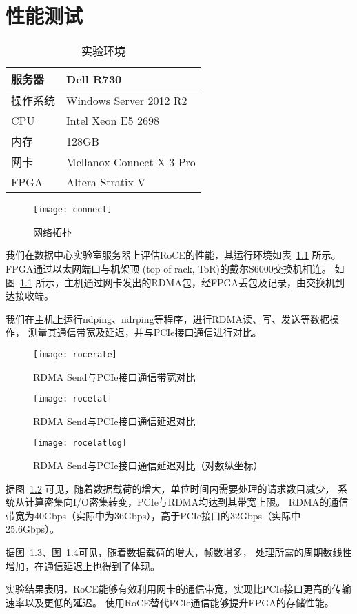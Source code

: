\chapter{性能测试}
\begin{table}[htbp]
\centering
\caption{实验环境}\label{tab:runconfig}
\begin{tabular}{l l}
\toprule
服务器 & Dell R730 \\
\midrule
操作系统 & Windows Server 2012 R2 \\
\midrule
CPU & Intel Xeon E5 2698 \\
\midrule
内存 & 128GB \\
\midrule
网卡 & Mellanox Connect-X 3 Pro \\
\midrule
FPGA & Altera Stratix V \\
\bottomrule
\end{tabular}
\end{table}
\begin{figure}[htbp]
\centering
\texttt{[image: connect]}
\caption{网络拓扑}\label{fig:connect}
\end{figure}
我们在数据中心实验室服务器上评估RoCE的性能，其运行环境如表~\ref{tab:runconfig} 所示。
FPGA通过以太网端口与机架顶 (top-of-rack, ToR)的戴尔S6000交换机\cite{s6000}相连。
如图~\ref{fig:connect} 所示，主机通过网卡发出的RDMA包，经FPGA丢包及记录，由交换机到达接收端。

我们在主机上运行ndping、ndrping等程序，进行RDMA读、写、发送等数据操作，
测量其通信带宽及延迟，并与PCIe接口通信进行对比。

\begin{figure}[htbp]
\centering
\texttt{[image: rocerate]}
\caption{RDMA Send与PCIe接口通信带宽对比}\label{fig:rocerate}
\end{figure}

\begin{figure}[htbp]
\centering
\texttt{[image: rocelat]}
\caption{RDMA Send与PCIe接口通信延迟对比}\label{fig:rocelat}
\end{figure}

\begin{figure}[htbp]
\centering
\texttt{[image: rocelatlog]}
\caption{RDMA Send与PCIe接口通信延迟对比（对数纵坐标）}\label{fig:rocelatlog}
\end{figure}

据图~\ref{fig:rocerate} 可见，随着数据载荷的增大，单位时间内需要处理的请求数目减少，
系统从计算密集向I/O密集转变，PCIe与RDMA均达到其带宽上限。
RDMA的通信带宽为40Gbps（实际中为36Gbps），高于PCIe接口的32Gbps（实际中25.6Gbps）。

据图~\ref{fig:rocelat}、图~\ref{fig:rocelatlog}可见，随着数据载荷的增大，帧数增多，
处理所需的周期数线性增加，在通信延迟上也得到了体现。

实验结果表明，RoCE能够有效利用网卡的通信带宽，实现比PCIe接口更高的传输速率以及更低的延迟。
使用RoCE替代PCIe通信能够提升FPGA的存储性能。
